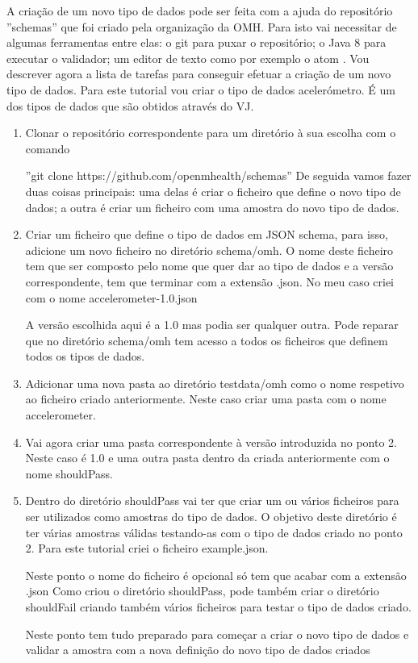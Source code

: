 A criação de um novo tipo de dados pode ser feita com a ajuda do repositório ''schemas'' \cite{schemas-rep} que foi criado pela organização da \gls{OMH}. Para isto vai necessitar de algumas ferramentas entre elas: o git \cite{git-install} para puxar o repositório; o Java 8 \cite{java-overview} para executar o validador; um editor de texto como por exemplo o atom \cite{atom-install}. Vou descrever agora a lista de tarefas para conseguir efetuar a criação de um novo tipo de dados. Para este tutorial vou criar o tipo de dados acelerómetro. É um dos tipos de dados que são obtidos através do \gls{VJ}.

\begin{enumerate}
  \item Clonar o repositório correspondente para um diretório à sua escolha com o comando \par
  ''git clone https://github.com/openmhealth/schemas'' 
  De seguida vamos fazer duas coisas principais: uma delas é criar o ficheiro que define o novo tipo de dados; a outra é criar um ficheiro com uma amostra do novo tipo de dados.
  \item Criar um ficheiro que define o tipo de dados em \gls{JSON} schema, para isso, adicione um novo ficheiro no diretório schema/omh. O nome deste ficheiro tem que ser composto pelo nome que quer dar ao tipo de dados e a versão correspondente, tem que terminar com a extensão .json. No meu caso criei com o nome accelerometer-1.0.json  \par A versão escolhida aqui é a 1.0 mas podia ser qualquer outra. Pode reparar que no diretório schema/omh tem acesso a todos os ficheiros que definem todos os tipos de dados.
  \item Adicionar uma nova pasta ao diretório testdata/omh como o nome respetivo ao ficheiro criado anteriormente. Neste caso criar uma pasta com o nome accelerometer.
  \item Vai agora criar uma pasta correspondente à versão introduzida no ponto 2. Neste caso é 1.0 e uma outra pasta dentro da criada anteriormente com o nome shouldPass.
  \item Dentro do diretório shouldPass vai ter que criar um ou vários ficheiros para ser utilizados como amostras do tipo de dados. O objetivo deste diretório é ter várias amostras válidas testando-as com o tipo de dados criado no ponto 2. Para este tutorial criei o ficheiro example.json. \par Neste ponto o nome do ficheiro é opcional só tem que acabar com a extensão .json
  Como criou o diretório shouldPass, pode também criar o diretório shouldFail criando também vários ficheiros para testar o tipo de dados criado. \par 
  Neste ponto tem tudo preparado para começar a criar o novo tipo de dados e validar a amostra com a nova definição do novo tipo de dados criados
  

\end{enumerate}
